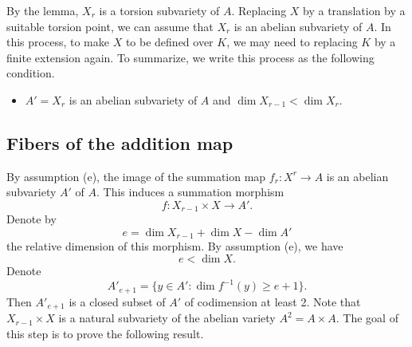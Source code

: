 \documentclass[12pt]{amsart}
\begin{document}
By the lemma, $X_r$ is a torsion subvariety of $A$. Replacing $X$ by a translation by a suitable torsion point, we can assume that $X_r$ is an abelian subvariety of $A$. In this process, to make $X$ to be defined over $K$, we may need to replacing $K$ by a finite extension again.
To summarize, we write this process as the following condition. 
\begin{itemize}
\item[(e)] $A'=X_r$ is an abelian subvariety of $A$ and $\dim X_{r-1}<\dim X_r$. 
\end{itemize} 



\subsection{Fibers of the addition map}

By assumption (e), the image of the summation map $f_r:X^r\to A$
is an abelian subvariety $A'$ of $A$. 
This induces a summation morphism 
$$f:X_{r-1}\times X\longrightarrow A'.$$
Denote by 
$$e=\dim X_{r-1}+\dim X-\dim A'$$ 
the relative dimension of this morphism. 
By assumption (e), we have
$$e<\dim X.$$
Denote 
$$
A'_{e+1}=\{y\in A': \dim f^{-1}(y)\geq e+1 \}.
$$
Then $A'_{e+1}$ is a closed subset of $A'$ of codimension at least 2. 
Note that $X_{r-1}\times X$ is a natural subvariety of the abelian variety $A^2=A\times A$. 
The goal of this step is to prove the following result.
\end{document}
